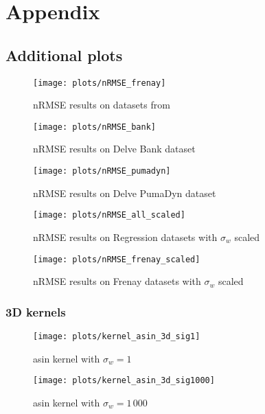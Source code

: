 \chapter{Appendix}

\section{Additional plots}

\begin{figure}[H]
    \texttt{[image: plots/nRMSE\_frenay]}
    \caption{nRMSE results on datasets from \cite{frenayParameterinsensitiveKernelExtreme2011}}
\end{figure}

\begin{figure}[H]
    \texttt{[image: plots/nRMSE\_bank]}
    \caption{nRMSE results on Delve Bank dataset}
\end{figure}

\begin{figure}[H]
    \texttt{[image: plots/nRMSE\_pumadyn]}
    \caption{nRMSE results on Delve PumaDyn dataset}
\end{figure}

\begin{figure}[H]
    \texttt{[image: plots/nRMSE\_all\_scaled]}
    \caption{nRMSE results on Regression datasets with $\sigma_w$ scaled}
\end{figure}

\begin{figure}[H]
    \texttt{[image: plots/nRMSE\_frenay\_scaled]}
    \caption{nRMSE results on Frenay datasets with $\sigma_w$ scaled}
\end{figure}

\subsection{3D kernels}

\begin{figure}
    \texttt{[image: plots/kernel\_asin\_3d\_sig1]}
    \caption{asin kernel with $\sigma_w=1$}
\end{figure}

\begin{figure}
    \texttt{[image: plots/kernel\_asin\_3d\_sig1000]}
    \caption{asin kernel with $\sigma_w=1\,000$}
\end{figure}


